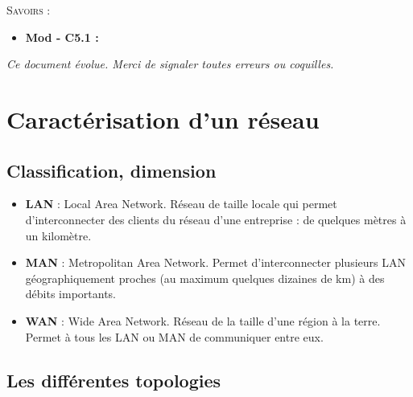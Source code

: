 \documentclass[10pt]{article}
\begin{document}
\begin{savoir}
\textsc{Savoirs :}
\begin{itemize}
\item \textbf{Mod - C5.1 :} %
\end{itemize}
\end{savoir}


\setlength{\parskip}{0ex plus 0.2ex minus 0ex}
 \renewcommand{\contentsname}{}
 \renewcommand{\baselinestretch}{1}

\tableofcontents

 \renewcommand{\baselinestretch}{1.2}
\setlength{\parskip}{2ex plus 0.5ex minus 0.2ex}

\textit{Ce document évolue. Merci de signaler toutes erreurs ou coquilles.}

\section{Caractérisation d'un réseau}
\subsection{Classification, dimension}

\begin{itemize}
\item \textbf{LAN} : Local Area Network. Réseau de taille locale qui permet d’interconnecter des clients du réseau d’une entreprise : de quelques mètres à un kilomètre.
\item \textbf{MAN} : Metropolitan Area Network. Permet d’interconnecter plusieurs LAN géographiquement proches (au maximum quelques dizaines de km) à des débits importants.
\item \textbf{WAN} : Wide Area Network. Réseau de la taille d’une région à la terre. Permet à tous les LAN ou MAN de communiquer entre eux.
\end{itemize}

\subsection{Les différentes topologies}
\end{document}
